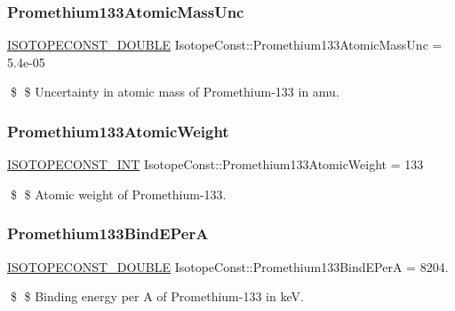 \subsubsection{\texorpdfstring{Promethium133\+Atomic\+Mass\+Unc}{Promethium133AtomicMassUnc}}
{\footnotesize\ttfamily \mbox{\hyperlink{group___isotope_const-_macros_ga8f45a7272ce02c0b4c65c44636ed719a}{I\+S\+O\+T\+O\+P\+E\+C\+O\+N\+S\+T\+\_\+\+D\+O\+U\+B\+LE}} Isotope\+Const\+::\+Promethium133\+Atomic\+Mass\+Unc = 5.\+4e-\/05}

\$ \$ Uncertainty in atomic mass of Promethium-\/133 in amu. \mbox{\label{group___isotope_const-_promethium-_pm133_ga37edc989afca31fb82f6171d3d38c3bb}} 
\subsubsection{\texorpdfstring{Promethium133\+Atomic\+Weight}{Promethium133AtomicWeight}}
{\footnotesize\ttfamily \mbox{\hyperlink{group___isotope_const-_macros_ga5f18360b3e99483a35c32d789e62621c}{I\+S\+O\+T\+O\+P\+E\+C\+O\+N\+S\+T\+\_\+\+I\+NT}} Isotope\+Const\+::\+Promethium133\+Atomic\+Weight = 133}

\$ \$ Atomic weight of Promethium-\/133. \mbox{\label{group___isotope_const-_promethium-_pm133_gaa871290632aa8cc7fdd1a954f3aa7a9d}} 
\subsubsection{\texorpdfstring{Promethium133\+Bind\+E\+PerA}{Promethium133BindEPerA}}
{\footnotesize\ttfamily \mbox{\hyperlink{group___isotope_const-_macros_ga8f45a7272ce02c0b4c65c44636ed719a}{I\+S\+O\+T\+O\+P\+E\+C\+O\+N\+S\+T\+\_\+\+D\+O\+U\+B\+LE}} Isotope\+Const\+::\+Promethium133\+Bind\+E\+PerA = 8204.}

\$ \$ Binding energy per A of Promethium-\/133 in keV. \mbox{\label{group___isotope_const-_promethium-_pm133_gaae44dc3dc1af7785c603e0151eb24bb2}} 
